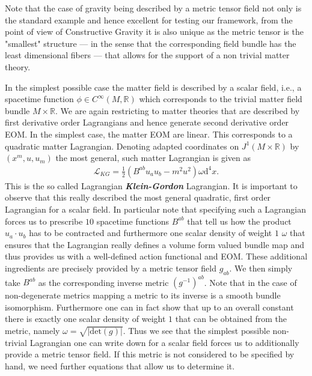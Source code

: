 \documentclass[a4paper,12pt, DIV=14, BCOR=5mm, twoside, headsepline, numbers=noenddot]{scrbook}
\begin{document}
Note that the case of gravity being described by a metric tensor field not only is the standard example and hence excellent for testing our framework, from the point of view of Constructive Gravity it is also unique as the metric tensor is the "smallest" structure --- in the sense that the corresponding field bundle has the least dimensional fibers --- that allows for the support of a non trivial matter theory.

In the simplest possible case the matter field is described by a scalar field, i.e., a spacetime function $\phi \in C^{\infty}(M,\mathbb{R})$ which corresponds to the trivial matter field bundle $M \times \mathbb{R}$. We are again restricting to matter theories that are described by first derivative order Lagrangians and hence generate second derivative order EOM. In the simplest case, the matter EOM are linear. This corresponds to a quadratic matter Lagrangian. Denoting adapted coordinates on $J^1(M \times \mathbb{R})$ by $(x^m,u,u_m)$ the most general, such matter Lagrangian is given as
\begin{align}\label{KGL}
    \mathcal{L}_{KG} = \frac{1}{2} \left ( B^{ab} u_a u_b - m^2 u^2\right )\omega \mathrm{d}^4x.
\end{align}
This is the so called Lagrangian \textit{\textbf{Klein-Gordon}} Lagrangian. It is important to observe that this really described the most general quadratic, first order Lagrangian for a scalar field. 
In particular note that specifying such a Lagrangian forces us to prescribe $10$ spacetime functions $B^{ab}$ that tell us how the product $u_a\cdot u_b$ has to be contracted and furthermore one scalar density of weight $1$ $\omega$ that ensures that the Lagrangian really defines a volume form valued bundle map and thus provides us with a well-defined action functional and EOM.
These additional ingredients are precisely provided by a metric tensor field $g_{ab}$. We then simply take $B^{ab}$ as the corresponding inverse metric $(g^{-1})^{ab}$. Note that in the case of non-degenerate metrics mapping a metric to its inverse is a smooth bundle isomorphism. Furthermore one can in fact show that up to an overall constant there is exactly one scalar density of weight $1$ that can be obtained from the metric, namely $\omega = \sqrt{ \vert \mathrm{det}(g) \vert }$. 
Thus we see that the simplest possible non-trivial Lagrangian one can write down for a scalar field forces us to additionally provide a metric tensor field. If this metric is not considered to be specified by hand, we need further equations that allow us to determine it.  
\end{document}
